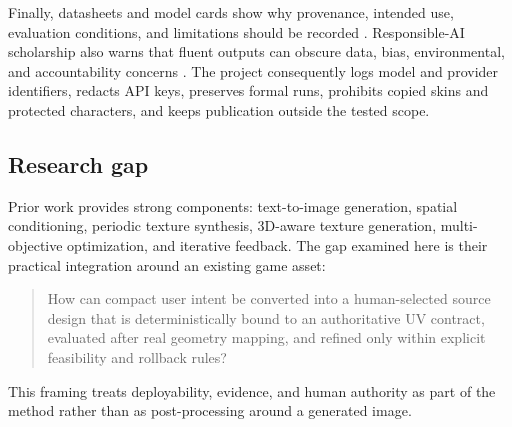 Finally, datasheets and model cards show why provenance, intended use, evaluation
conditions, and limitations should be recorded
\citep{gebru2021datasheets,mitchell2019modelcards}. Responsible-AI scholarship
also warns that fluent outputs can obscure data, bias, environmental, and
accountability concerns \citep{bender2021parrots}. The project consequently logs
model and provider identifiers, redacts API keys, preserves formal runs, prohibits
copied skins and protected characters, and keeps publication outside the tested
scope.

\subsection{Research gap}

Prior work provides strong components: text-to-image generation, spatial
conditioning, periodic texture synthesis, 3D-aware texture generation,
multi-objective optimization, and iterative feedback. The gap examined here is
their practical integration around an existing game asset:

\begin{quote}
How can compact user intent be converted into a human-selected source design that
is deterministically bound to an authoritative UV contract, evaluated after real
geometry mapping, and refined only within explicit feasibility and rollback rules?
\end{quote}

This framing treats deployability, evidence, and human authority as part of the
method rather than as post-processing around a generated image.
